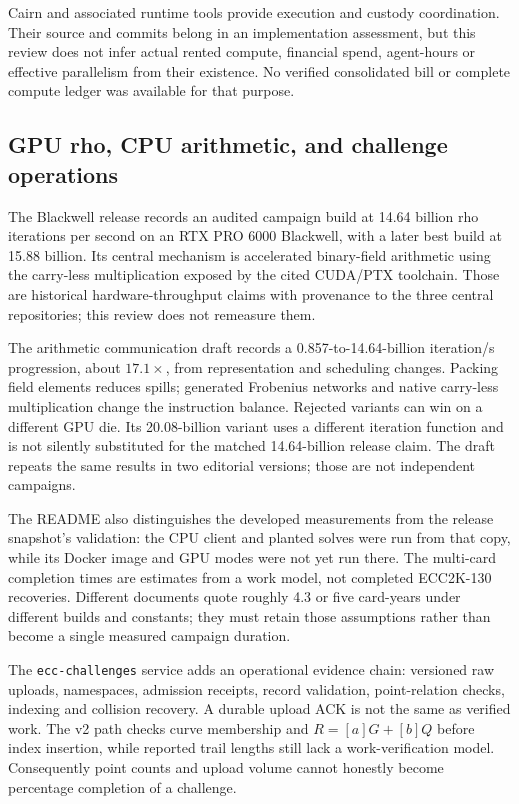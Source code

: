 Cairn and associated runtime tools provide execution and custody
coordination. Their source and commits belong in an implementation
assessment, but this review does not infer actual rented compute,
financial spend, agent-hours or effective parallelism from their
existence. No verified consolidated bill or complete compute ledger
was available for that purpose.

\subsection{GPU rho, CPU arithmetic, and challenge operations}

The Blackwell release records an audited campaign build at 14.64
billion rho iterations per second on an RTX PRO 6000 Blackwell, with a
later best build at 15.88 billion. Its central mechanism is accelerated
binary-field arithmetic using the carry-less multiplication exposed by
the cited CUDA/PTX toolchain. Those are historical hardware-throughput
claims with provenance to the three central repositories; this review
does not remeasure them.

The arithmetic communication draft records a 0.857-to-14.64-billion
iteration/s progression, about $17.1\times$, from representation and
scheduling changes. Packing field elements reduces spills; generated
Frobenius networks and native carry-less multiplication change the
instruction balance. Rejected variants can win on a different GPU die.
Its 20.08-billion variant uses a different iteration function and is not
silently substituted for the matched 14.64-billion release claim. The
draft repeats the same results in two editorial versions; those are not
independent campaigns.

The README also distinguishes the developed measurements from the
release snapshot's validation: the CPU client and planted solves were
run from that copy, while its Docker image and GPU modes were not yet
run there. The multi-card completion times are estimates from a work
model, not completed ECC2K-130 recoveries. Different documents quote
roughly 4.3 or five card-years under different builds and constants;
they must retain those assumptions rather than become a single measured
campaign duration.

The \texttt{ecc-challenges} service adds an operational evidence chain:
versioned raw uploads, namespaces, admission receipts, record validation,
point-relation checks, indexing and collision recovery. A durable upload
ACK is not the same as verified work. The v2 path checks curve membership
and $R=[a]G+[b]Q$ before index insertion, while reported trail lengths
still lack a work-verification model. Consequently point counts and
upload volume cannot honestly become percentage completion of a
challenge.

